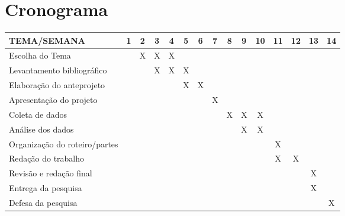 \section{Cronograma}

\begin{table}[h]
    \centering
    \begin{tabular}{l|c|c|c|c|c|c|c|c|c|c|c|c|c|c}
        \textbf{TEMA/SEMANA}&1&2&3&4&5&6&7&8&9&10&11&12&13&14 \\\hline
         Escolha do Tema & & X &X&X&&&&&&&&&& \\\hline
         Levantamento bibliográfico &&&X&X&X&&&&&&&&&\\\hline
         Elaboração do anteprojeto &&&&&X&X&&&&&&&&\\\hline
         Apresentação do projeto &&&&&&&X&&&&&&&\\\hline \hline
         Coleta de dados &&&&&&&&X&X&X&&&&\\\hline
         Análise dos dados &&&&&&&&&X&X&&&&\\\hline
         Organização do roteiro/partes &&&&&&&&&&&X&&&\\\hline
         Redação do trabalho &&&&&&&&&&&X&X&&\\\hline
         Revisão e redação final &&&&&&&&&&&&&X&\\\hline
         Entrega da pesquisa &&&&&&&&&&&&&X&\\\hline
         Defesa da pesquisa &&&&&&&&&&&&&&X\\\hline
    \end{tabular}
    \label{tab:my_label}
\end{table}